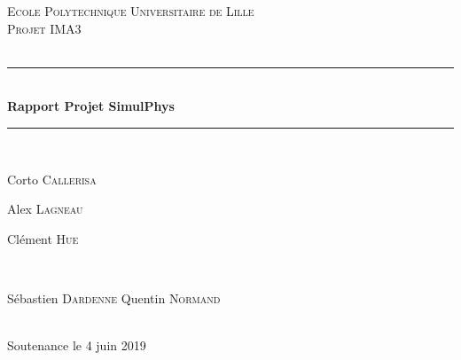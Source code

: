 \documentclass[12pt]{article}
\begin{document}
\begin{titlepage}

\newcommand{\HRule}{\rule{\linewidth}{0.5mm}} %

\center %
 

\textsc{\LARGE Ecole Polytechnique Universitaire de Lille}\\[1.5cm] %
\textsc{\Large Projet IMA3}\\[0.5cm] %
\textsc{\large }\\[0.5cm] %


\HRule \\[0.4cm]
{ \huge \bfseries Rapport Projet SimulPhys }\\[0.4cm] %
\HRule \\[1.5cm]
 


\begin{minipage}{0.4\textwidth}
\begin{flushleft} \large
Corto \textsc{Callerisa} %

Alex \textsc{Lagneau} %

Clément \textsc{Hue} %
\end{flushleft}
\end{minipage}
~
\begin{minipage}{0.4\textwidth}
\begin{flushright} \large
Sébastien \textsc{Dardenne} %
Quentin \textsc{Normand} %
\end{flushright}
\end{minipage}\\[2cm]




{\large{Soutenance le 4 juin 2019}}\\[2cm] %


\end{titlepage}
\end{document}
